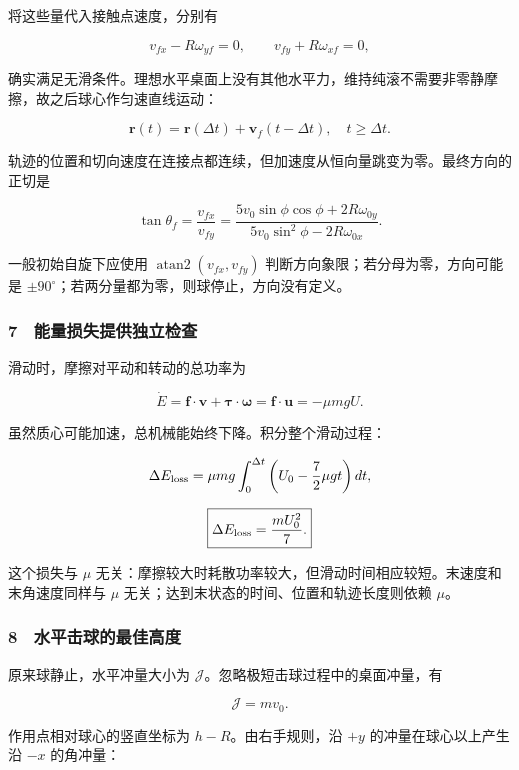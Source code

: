 \documentclass[12pt,a4paper,fontset=fandol]{ctexart}
\begin{document}
将这些量代入接触点速度，分别有

\[v_{fx}-R\omega_{yf}=0,
\qquad v_{fy}+R\omega_{xf}=0,\]

确实满足无滑条件。理想水平桌面上没有其他水平力，维持纯滚不需要非零静摩擦，故之后球心作匀速直线运动：

\[\boxed{\boldsymbol r(t)=\boldsymbol r(\Delta t)
+\boldsymbol v_f(t-\Delta t),\quad t\ge\Delta t.}\]

轨迹的位置和切向速度在连接点都连续，但加速度从恒向量跳变为零。最终方向的正切是

\[\boxed{\tan\theta_f=
\frac{v_{fx}}{v_{fy}}
=\frac{5v_0\sin\phi\cos\phi+2R\omega_{0y}}
{5v_0\sin^2\phi-2R\omega_{0x}}.}\]

一般初始自旋下应使用 \(\operatorname{atan2}(v_{fx},v_{fy})\)
判断方向象限；若分母为零，方向可能是
\(\pm90^\circ\)；若两分量都为零，则球停止，方向没有定义。

\subsubsection{7　能量损失提供独立检查}\label{ux80fdux91cfux635fux5931ux63d0ux4f9bux72ecux7acbux68c0ux67e5}

滑动时，摩擦对平动和转动的总功率为

\[\dot E=\boldsymbol f\cdot\boldsymbol v
+\boldsymbol\tau\cdot\boldsymbol\omega
=\boldsymbol f\cdot\boldsymbol u
=-\mu mgU.\]

虽然质心可能加速，总机械能始终下降。积分整个滑动过程：

\[\Delta E_{\rm loss}
=\mu mg\int_0^{\Delta t}
\left(U_0-\frac72\mu gt\right)dt,\]

\[\boxed{\Delta E_{\rm loss}=\frac{mU_0^2}{7}.}\]

这个损失与 \(\mu\)
无关：摩擦较大时耗散功率较大，但滑动时间相应较短。末速度和末角速度同样与
\(\mu\) 无关；达到末状态的时间、位置和轨迹长度则依赖 \(\mu\)。

\subsubsection{8　水平击球的最佳高度}\label{ux6c34ux5e73ux51fbux7403ux7684ux6700ux4f73ux9ad8ux5ea6}

原来球静止，水平冲量大小为
\(\mathcal J\)。忽略极短击球过程中的桌面冲量，有

\[\mathcal J=mv_0.\]

作用点相对球心的竖直坐标为 \(h-R\)。由右手规则，沿 \(+y\)
的冲量在球心以上产生沿 \(-x\) 的角冲量：
\end{document}
